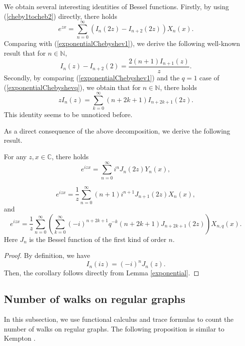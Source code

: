 \documentclass{article}
\begin{document}
\begin{remark}

We obtain several interesting identities of Bessel functions. Firstly, by using (\ref{cheby1tocheb2}) directly, there holds
$$e^{zx}=\sum_{n=0}^{\infty}(I_{n}(2z)-I_{n+2}(2z))X_n(x).$$
Comparing with (\ref{exponentialChebyshev1}), we derive the following well-known result that for $n\in \mathbb{N}$,
\begin{equation}\label{Besselproperty}
    I_{n}(z)-I_{n+2}(2)=\frac{2(n+1)I_{n+1}(z)}{z}.
\end{equation}
Secondly, by comparing (\ref{exponentialChebyshev1}) and the $q=1$ case of (\ref{exponentialChebyshevq}), we obtain that for $n\in \mathbb{N}$, there holds
$$zI_n(z)=\sum_{k=0}^{\infty}(n+2k+1)I_{n+2k+1}(2z).$$
This identity seems to be unnoticed before.
\end{remark}
As a direct consequence of the above decomposition, we derive the following result.
\begin{corollary}
    For any $z,x\in \mathbb{C}$, there holds 
\begin{equation}\label{wavechebyshev1}
e^{izx}=\sum_{n=0}^{\infty}i^{n}J_{n}(2z)Y_n(x),
\end{equation}

\begin{equation}\label{wavechebyshev2}
e^{izx}=\frac{1}{z}\sum_{n=0}^{\infty}(n+1)i^{n+1}J_{n+1}(2z)X_n(x),
\end{equation}
and
\begin{equation}\label{wavechebyshevq}
e^{izx}=\frac{1}{z}\sum_{n=0}^{\infty}\left(\sum_{k=0}^{\infty}(-i)^{n+2k+1}q^{-k}(n+2k+1)J_{n+2k+1}(2z)\right) X_{n,q}(x).
\end{equation}
Here $J_n$ is the Bessel function of the first kind of order $n$.
\end{corollary}

\begin{proof}
    By definition, we have $$I_n(iz)=(-i)^{n}J_n(z).$$ Then, the corollary follows directly from Lemma \ref{exponential}.
\end{proof}

\subsection{Number of walks on regular graphs}
In this subsection, we use functional calculus and trace formulas to count the number of walks on regular graphs. The following proposition is similar to Kempton \cite[Lemma 3.1]{kempton18}.
\end{document}
